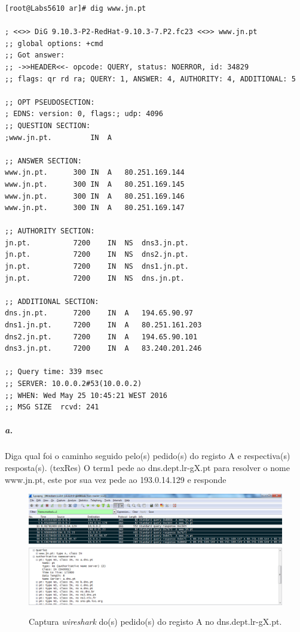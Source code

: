 \begin{verbatim}
[root@Labs5610 ar]# dig www.jn.pt

; <<>> DiG 9.10.3-P2-RedHat-9.10.3-7.P2.fc23 <<>> www.jn.pt
;; global options: +cmd
;; Got answer:
;; ->>HEADER<<- opcode: QUERY, status: NOERROR, id: 34829
;; flags: qr rd ra; QUERY: 1, ANSWER: 4, AUTHORITY: 4, ADDITIONAL: 5

;; OPT PSEUDOSECTION:
; EDNS: version: 0, flags:; udp: 4096
;; QUESTION SECTION:
;www.jn.pt.			IN	A

;; ANSWER SECTION:
www.jn.pt.		300	IN	A	80.251.169.144
www.jn.pt.		300	IN	A	80.251.169.145
www.jn.pt.		300	IN	A	80.251.169.146
www.jn.pt.		300	IN	A	80.251.169.147

;; AUTHORITY SECTION:
jn.pt.			7200	IN	NS	dns3.jn.pt.
jn.pt.			7200	IN	NS	dns2.jn.pt.
jn.pt.			7200	IN	NS	dns1.jn.pt.
jn.pt.			7200	IN	NS	dns.jn.pt.

;; ADDITIONAL SECTION:
dns.jn.pt.		7200	IN	A	194.65.90.97
dns1.jn.pt.		7200	IN	A	80.251.161.203
dns2.jn.pt.		7200	IN	A	194.65.90.101
dns3.jn.pt.		7200	IN	A	83.240.201.246

;; Query time: 339 msec
;; SERVER: 10.0.0.2#53(10.0.0.2)
;; WHEN: Wed May 25 10:45:21 WEST 2016
;; MSG SIZE  rcvd: 241
\end{verbatim}

\subparagraph{a.}
Diga qual foi o caminho seguido pelo(s) pedido(s) do registo A e respectiva(s) resposta(s). (texRes)
O \textsf{term1} pede ao \textsf{dns.dept.lr-gX.pt} para resolver o nome www.jn.pt, este por sua vez pede ao \textsf{193.0.14.129} e responde 

\begin{figure}[h]
\centering
\includegraphics[width=1\textwidth, height=0.38\textheight]{3a_cap.png}
\label{fig:2-capturaWireshark}
\caption{Captura \emph{wireshark} do(s) pedido(s) do registo A no \textsf{dns.dept.lr-gX.pt}.}
\end{figure}


